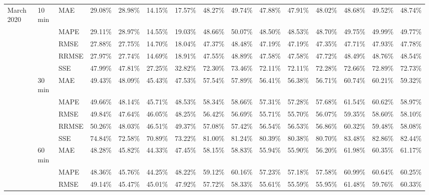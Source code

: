 {\begin{longtable}{lllcccccccccccc}
{March 2020} & {10 min} & {MAE} & {29.08\%} & {28.98\%} & {14.15\%} & {17.57\%} & {48.27\%} & {49.74\%} & {47.88\%} & {47.91\%} & {48.02\%} & {48.68\%} & {49.52\%} & {48.74\%} \\
{} & {} & {MAPE} & {29.11\%} & {28.97\%} & {14.55\%} & {19.03\%} & {48.66\%} & {50.07\%} & {48.50\%} & {48.53\%} & {48.70\%} & {49.75\%} & {49.99\%} & {49.77\%} \\
{} & {} & {RMSE} & {27.88\%} & {27.75\%} & {14.70\%} & {18.04\%} & {47.37\%} & {48.48\%} & {47.19\%} & {47.19\%} & {47.35\%} & {47.71\%} & {47.93\%} & {47.78\%} \\
{} & {} & {RRMSE} & {27.97\%} & {27.74\%} & {14.69\%} & {18.91\%} & {47.55\%} & {48.89\%} & {47.58\%} & {47.58\%} & {47.72\%} & {48.49\%} & {48.76\%} & {48.54\%} \\
{} &  & {SSE} & {47.99\%} & {47.81\%} & {27.25\%} & {32.82\%} & {72.30\%} & {73.46\%} & {72.11\%} & {72.11\%} & {72.28\%} & {72.66\%} & {72.89\%} & {72.73\%} \\
{} & {30 min} & {MAE} & {49.43\%} & {48.09\%} & {45.43\%} & {47.53\%} & {57.54\%} & {57.89\%} & {56.41\%} & {56.38\%} & {56.71\%} & {60.74\%} & {60.21\%} & {59.32\%} \\
{} & {} & {MAPE} & {49.66\%} & {48.14\%} & {45.71\%} & {48.53\%} & {58.34\%} & {58.66\%} & {57.31\%} & {57.28\%} & {57.68\%} & {61.54\%} & {60.62\%} & {58.97\%} \\
{} & {} & {RMSE} & {49.84\%} & {47.64\%} & {46.05\%} & {48.25\%} & {56.42\%} & {56.69\%} & {55.71\%} & {55.70\%} & {56.07\%} & {59.35\%} & {58.60\%} & {58.10\%} \\
{} & {} & {RRMSE} & {50.26\%} & {48.03\%} & {46.51\%} & {49.37\%} & {57.08\%} & {57.42\%} & {56.54\%} & {56.53\%} & {56.86\%} & {60.32\%} & {59.48\%} & {58.08\%} \\
{} &  & {SSE} & {74.84\%} & {72.58\%} & {70.89\%} & {73.22\%} & {81.00\%} & {81.24\%} & {80.39\%} & {80.38\%} & {80.70\%} & {83.48\%} & {82.86\%} & {82.44\%} \\
{} & {60 min} & {MAE} & {48.28\%} & {45.82\%} & {44.33\%} & {47.45\%} & {58.15\%} & {58.83\%} & {55.94\%} & {55.90\%} & {56.20\%} & {61.98\%} & {60.35\%} & {61.17\%} \\
{} & {} & {MAPE} & {48.36\%} & {45.76\%} & {44.25\%} & {48.22\%} & {59.12\%} & {60.16\%} & {57.23\%} & {57.18\%} & {57.58\%} & {60.99\%} & {60.64\%} & {60.25\%} \\
{} & {} & {RMSE} & {49.14\%} & {45.47\%} & {45.01\%} & {47.92\%} & {57.72\%} & {58.33\%} & {55.61\%} & {55.59\%} & {55.95\%} & {61.48\%} & {59.76\%} & {60.33\%} \\

\end{longtable}}
